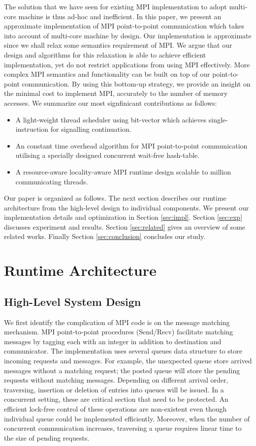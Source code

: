 \documentclass{sig-alternate-05-2015}
\begin{document}
The solution that we have seen for existing MPI implementation to adopt
multi-core machine is thus ad-hoc and inefficient. In this paper, we present an
approximate implementation of MPI point-to-point communication which takes into
account of multi-core machine by design. Our implementation is approximate
since we shall relax some semantics requirement of MPI. We argue that our
design and algorithms for this relaxation is able to achieve efficient
implementation, yet do not restrict applications from using MPI effectively.
More complex MPI semantics and functionality can be built on top of our
point-to-point communication. By using this bottom-up strategy, we provide an
insight on the minimal cost to implement MPI, accurately to the number of
memory accesses. We summarize our most signfinicant contributions as follows:
\begin{itemize}
  \item A light-weight thread scheduler using bit-vector which achieves
single-instruction for signalling continuation. 
  \item An constant time overhead algorithm for MPI point-to-point communication
utilising a specially designed concurrent wait-free hash-table.
  \item A resource-aware locality-aware MPI runtime design scalable to million
communicating threads.
\end{itemize}

Our paper is organized as follows. The next section describes our runtime
architecture from the high-level design to individual components. We present
our implementation details and optimization in Section \ref{sec:impl}. Section
\ref{sec:exp} discusses experiment and results. Section \ref{sec:related} gives
an overview of some related works. Finally Section \ref{sec:conclusion} concludes
our study.

\section{Runtime Architecture}
\label{sec:runtime}
\subsection{High-Level System Design}
We first identify the complication of MPI code is on the message matching
mechanism. MPI point-to-point procedures (Send/Recv) facilitate matching
messages by tagging each with an integer in addition to destination and
communicator. The implementation uses several queues data structure to store
incoming requests and messages. For example, the unexpected queue store arrived
messages without a matching request; the posted queue will store the pending
requests without matching messages. Depending on different arrival order,
traversing, insertion or deletion of entries into queues will be issued. In a
concurrent setting, these are critical section that need to be protected. An
efficient lock-free control of these operations are non-existent even though
individual queue could be implemented efficiently.  Moreover, when the number
of concurrent communication increases, traversing a queue requires linear time
to the size of pending requests.
\end{document}

